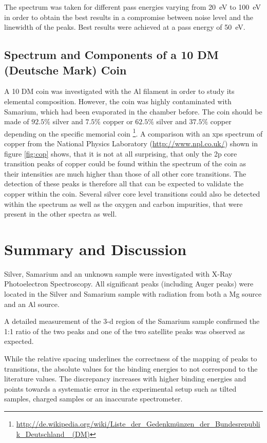 \documentclass[a4paper]{scrartcl}
\numberwithin{equation}{section}
\numberwithin{figure}{section}
\numberwithin{table}{section}
\begin{document}
The spectrum was taken for different pass energies varying from \SI{20}{eV} to \SI{100}{eV} in order to obtain the best results in a compromise between noise level and the linewidth of the peaks. Best results were achieved at a pass energy of \SI{50}{eV}.  


\subsection{Spectrum and Components of a 10 DM (Deutsche Mark) Coin}
A 10 DM coin was investigated with the Al filament in order to study its elemental composition. However, the coin was highly contaminated with Samarium, which had been evaporated in the chamber before. The coin should be made of $92.5 \%$ silver and $7.5\%$ copper or $62.5 \%$ silver and $37.5 \%$ copper depending on the specific memorial coin \footnote{\url{http://de.wikipedia.org/wiki/Liste_der_Gedenkmünzen_der_Bundesrepublik_Deutschland _(DM)}}. A comparison with an xps spectrum of copper from the National Physics Laboratory (\url{http://www.npl.co.uk/}) shown in figure \ref{fig:cop} shows, that it is not at all surprising, that only the 2p core transition peaks of copper could be found within the spectrum of the coin as their intensities are much higher than those of all other core transitions. The detection of these peaks is therefore all that can be expected to validate the copper within the coin. Several silver core level transitions could also be detected within the spectrum as well as the oxygen and carbon impurities, that were present in the other spectra as well.


\section{Summary and Discussion}
Silver, Samarium and an unknown sample were investigated with X-Ray Photoelectron Spectroscopy. All significant peaks (including Auger peaks) were located in the Silver and Samarium sample with radiation from both a Mg source and an Al source.

A detailed measurement of the 3-d region of the Samarium sample confirmed the 1:1 ratio of the two peaks and one of the two satellite peaks was observed as expected.

While the relative spacing underlines the correctness of the mapping of peaks to transitions, the absolute values for the binding energies to not correspond to the literature values. The discrepancy increases with higher binding energies and points towards a systematic error in the experimental setup such as tilted samples, charged samples or an inaccurate spectrometer.
\end{document}
